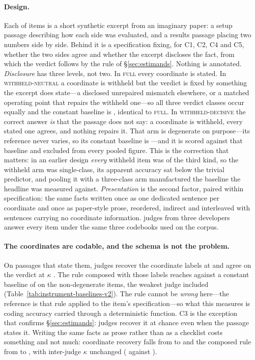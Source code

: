 \documentclass[11pt]{article}
\begin{document}
\paragraph{Design.}
Each of \InsTwoItems{} items is a short synthetic excerpt from an imaginary
paper: a setup passage describing how each side was evaluated, and a results
passage placing two numbers side by side. Behind it is a specification fixing,
for C1, C2, C4 and C5, whether the two sides agree and whether the excerpt
discloses the fact, from which the verdict follows by the rule of
\S\ref{sec:estimands}. Nothing is annotated. \emph{Disclosure} has three levels,
not two. In \textsc{full} every coordinate is stated. In
\textsc{withheld-neutral} a coordinate is withheld but the verdict is fixed by
something the excerpt does state---a disclosed unrepaired mismatch elsewhere, or
a matched operating point that repairs the withheld one---so all three verdict
classes occur equally and the constant baseline is \InsBalBase{}, identical to
\textsc{full}. In \textsc{withheld-decisive} the correct answer \emph{is} that
the passage does not say: a coordinate is withheld, every stated one agrees, and
nothing repairs it. That arm is degenerate on purpose---its reference never
varies, so its constant baseline is \InsForceBase{}---and it is scored against
that baseline and excluded from every pooled figure. This is the correction that
matters: in an earlier design \emph{every} withheld item was of the third kind,
so the withheld arm was single-class, its apparent accuracy sat below the
trivial predictor, and pooling it with a three-class arm manufactured the
baseline the headline was measured against. \emph{Presentation} is the second
factor, paired within specification: the same facts written once as one
dedicated sentence per coordinate and once as paper-style prose, reordered,
indirect and interleaved with sentences carrying no coordinate information.
\InsTwoJudges{} judges from three developers answer every item under the same
three codebooks used on the corpus.

\paragraph{The coordinates are codable, and the schema is not the problem.}
On passages that state them, judges recover the coordinate labels at
\InsFullCoord{} and agree on the verdict at $\kappa$ \InsFullK{}. The rule
composed with those labels reaches \InsTwoRule{} against a constant baseline of
\InsTwoBase{} on the non-degenerate items, the weakest judge included
(Table~\ref{tab:instrument-baselines-v2}). The rule cannot be \emph{wrong}
here---the reference is that rule applied to the item's specification---so what
this measures is coding accuracy carried through a deterministic function. C3 is
the exception that confirms \S\ref{sec:estimands}: judges recover it at chance
even when the passage states it. Writing the same facts as prose rather than as
a checklist costs something and not much: coordinate recovery falls from
\InsCanonCoord{} to \InsNatCoord{} and the composed rule from \InsCanonRule{} to
\InsNatRule{}, with inter-judge $\kappa$ unchanged (\InsCanonK{} against
\InsNatK{}).
\end{document}

